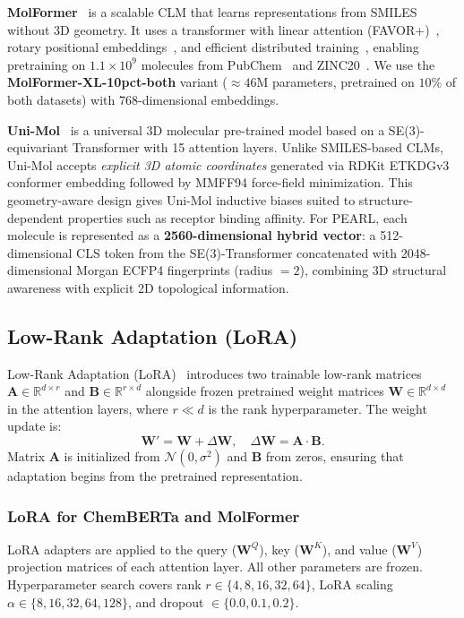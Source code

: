 \documentclass[final,1p,times]{elsarticle}
\begin{document}
\textbf{MolFormer}~\cite{ross2022molformer} is a scalable CLM that learns representations from SMILES without 3D geometry. It uses a transformer with linear attention (FAVOR+)~\cite{choromanski2021rethinking}, rotary positional embeddings~\cite{heo2024rotary}, and efficient distributed training~\cite{isard2009distributed}, enabling pretraining on $1.1\times 10^{9}$  molecules from PubChem~\cite{kim2023pubchem} and ZINC20~\cite{irwin2020zinc20}. We use the \textbf{MolFormer-XL-10pct-both} variant ($\approx 46$M parameters, pretrained on $10\%$ of both datasets) with 768-dimensional embeddings.

\textbf{Uni-Mol}~\cite{zhou2023unimol} is a universal 3D molecular pre-trained model based on a SE(3)-equivariant Transformer with 15 attention layers. Unlike SMILES-based CLMs, Uni-Mol accepts \emph{explicit 3D atomic coordinates} generated via RDKit ETKDGv3 conformer embedding followed by MMFF94 force-field minimization.
This geometry-aware design gives Uni-Mol inductive biases suited to structure-dependent properties such as receptor binding affinity. For PEARL, each molecule is represented as a \textbf{2560-dimensional hybrid vector}: a 512-dimensional CLS token from the SE(3)-Transformer concatenated with 2048-dimensional Morgan ECFP4 fingerprints (radius $= 2$), combining 3D structural awareness with explicit 2D topological information.

\subsection{Low-Rank Adaptation (LoRA)}\label{sec:lora}
Low-Rank Adaptation (LoRA)~\cite{hu2021lora} introduces two trainable low-rank matrices $\mathbf{A} \in \mathbb{R}^{d \times r}$ and $\mathbf{B} \in \mathbb{R}^{r \times d}$ alongside frozen pretrained weight matrices $\mathbf{W} \in \mathbb{R}^{d \times d}$ in the attention layers, where $r \ll d$ is the rank hyperparameter. The weight update is:
\begin{equation}
  \mathbf{W}' = \mathbf{W} + \Delta\mathbf{W}, \quad \Delta\mathbf{W} = \mathbf{A} \cdot \mathbf{B}.
\end{equation}
Matrix $\mathbf{A}$ is initialized from $\mathcal{N}(0, \sigma^2)$ and $\mathbf{B}$ from zeros, ensuring that adaptation begins from the pretrained representation.

\subsubsection{LoRA for ChemBERTa and MolFormer}
LoRA adapters are applied to the query ($\mathbf{W}^Q$), key ($\mathbf{W}^K$), and value ($\mathbf{W}^V$) projection matrices of each attention layer. All other parameters are frozen. Hyperparameter search covers rank $r \in \{4, 8, 16, 32, 64\}$, LoRA scaling $\alpha \in \{8, 16, 32, 64, 128\}$, and dropout $\in \{0.0, 0.1, 0.2\}$.
\end{document}

